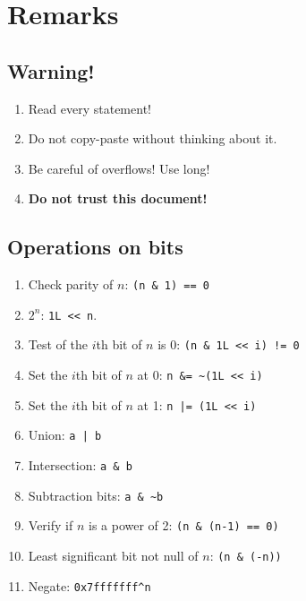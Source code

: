 \section{Remarks}
    \subsection{Warning!}
        \begin{enumerate}
            \item Read every statement!
            \item Do not copy-paste without thinking about it.
            \item Be careful of overflows! Use long!
            \item \textbf{Do not trust this document!}
        \end{enumerate}

    \subsection{Operations on bits}
        \begin{enumerate}
            \item Check parity of $n$: \lstinline{(n & 1) == 0}
            \item $2^n$: \lstinline|1L << n|.
            \item Test of the $i$th bit of $n$ is $0$: \lstinline{(n & 1L << i) != 0}
            \item Set the $i$th bit of $n$ at 0: \lstinline{n &= ~(1L << i)}
            \item Set the $i$th bit of $n$ at 1: \lstinline{n |= (1L << i)}
            \item Union: \lstinline{a | b}
            \item Intersection: \lstinline{a & b}
            \item Subtraction bits: \lstinline{a & ~b}
            \item Verify if $n$ is a power of 2: \lstinline{(n & (n-1) == 0)}
            \item Least significant bit not null of $n$: \lstinline{(n & (-n))}
            \item Negate: \lstinline{0x7fffffff^n}
        \end{enumerate}

